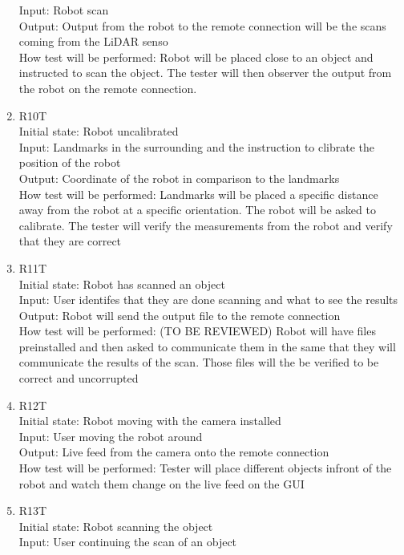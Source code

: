 \documentclass[12pt, titlepage]{article}
\begin{document}
\begin{enumerate}
Input: Robot scan\\
Output: Output from the robot to the remote connection will be the scans coming from the LiDAR senso\\
How test will be performed: Robot will be placed close to an object and instructed to scan the object. The tester will then observer the output from the robot on the remote connection. \\
\item{R10T\\}
Initial state: Robot uncalibrated \\
Input: Landmarks in the surrounding and the instruction to clibrate the position of the robot \\
Output: Coordinate of the robot in comparison to the landmarks\\
How test will be performed: Landmarks will be placed a specific distance away from the robot at a specific orientation. The robot will be asked to calibrate. The tester will verify the measurements from the robot and verify that they are correct \\
\item{R11T\\}
Initial state: Robot has scanned an object \\
Input: User identifes that they are done scanning and what to see the results \\
Output: Robot will send the output file to the remote connection  \\
How test will be performed: (TO BE REVIEWED) Robot will have files preinstalled and then asked to communicate them in the same that they will communicate the results of the scan. Those files will the be verified to be correct and uncorrupted \\
\item{R12T\\}
Initial state: Robot moving with the camera installed \\
Input: User moving the robot around \\
Output: Live feed from the camera onto the remote connection \\
How test will be performed: Tester will place different objects infront of the robot and watch them change on the live feed on the GUI\\
\item{R13T\\}
Initial state: Robot scanning the object\\
Input: User continuing the scan of an object \\

\end{enumerate}
\end{document}
